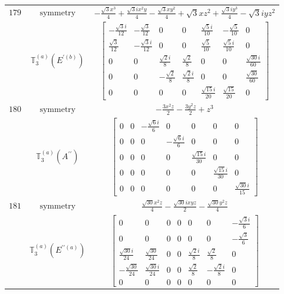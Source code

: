 \documentclass[fleqn,8pt,landscape]{jsarticle}
\begin{document}
\begin{longtable}{ccc}
$ 179 $ & $ \text{symmetry} $ & $ - \frac{\sqrt{3} x^{3}}{4} + \frac{\sqrt{3} i x^{2} y}{4} - \frac{\sqrt{3} x y^{2}}{4} + \sqrt{3} x z^{2} + \frac{\sqrt{3} i y^{3}}{4} - \sqrt{3} i y z^{2} $ \\
$  $ & $ \mathbb{T}_{3}^{(a)}(E^{\prime(b)}) $ & $ \begin{bmatrix} - \frac{\sqrt{3} i}{12} & - \frac{\sqrt{3}}{12} & 0 & 0 & \frac{\sqrt{5} i}{10} & - \frac{\sqrt{5}}{10} & 0 \\ \frac{\sqrt{3}}{12} & - \frac{\sqrt{3} i}{12} & 0 & 0 & \frac{\sqrt{5}}{10} & \frac{\sqrt{5} i}{10} & 0 \\ 0 & 0 & \frac{\sqrt{2} i}{8} & \frac{\sqrt{2}}{8} & 0 & 0 & \frac{\sqrt{30} i}{60} \\ 0 & 0 & - \frac{\sqrt{2}}{8} & \frac{\sqrt{2} i}{8} & 0 & 0 & \frac{\sqrt{30}}{60} \\ 0 & 0 & 0 & 0 & \frac{\sqrt{15} i}{20} & \frac{\sqrt{15}}{20} & 0 \end{bmatrix} $ \\ \hline
$ 180 $ & $ \text{symmetry} $ & $ - \frac{3 x^{2} z}{2} - \frac{3 y^{2} z}{2} + z^{3} $ \\
$  $ & $ \mathbb{T}_{3}^{(a)}(A^{\prime\prime}) $ & $ \begin{bmatrix} 0 & 0 & - \frac{\sqrt{6} i}{6} & 0 & 0 & 0 & 0 \\ 0 & 0 & 0 & - \frac{\sqrt{6} i}{6} & 0 & 0 & 0 \\ 0 & 0 & 0 & 0 & \frac{\sqrt{15} i}{30} & 0 & 0 \\ 0 & 0 & 0 & 0 & 0 & \frac{\sqrt{15} i}{30} & 0 \\ 0 & 0 & 0 & 0 & 0 & 0 & \frac{\sqrt{30} i}{15} \end{bmatrix} $ \\ \hline
$ 181 $ & $ \text{symmetry} $ & $ \frac{\sqrt{30} x^{2} z}{4} - \frac{\sqrt{30} i x y z}{2} - \frac{\sqrt{30} y^{2} z}{4} $ \\
$  $ & $ \mathbb{T}_{3}^{(a)}(E^{\prime\prime(a)}) $ & $ \begin{bmatrix} 0 & 0 & 0 & 0 & 0 & 0 & - \frac{\sqrt{3} i}{6} \\ 0 & 0 & 0 & 0 & 0 & 0 & - \frac{\sqrt{3}}{6} \\ \frac{\sqrt{30} i}{24} & \frac{\sqrt{30}}{24} & 0 & 0 & \frac{\sqrt{2} i}{8} & \frac{\sqrt{2}}{8} & 0 \\ - \frac{\sqrt{30}}{24} & \frac{\sqrt{30} i}{24} & 0 & 0 & \frac{\sqrt{2}}{8} & - \frac{\sqrt{2} i}{8} & 0 \\ 0 & 0 & 0 & 0 & 0 & 0 & 0 \end{bmatrix} $ \\ \hline

\end{longtable}
\end{document}
